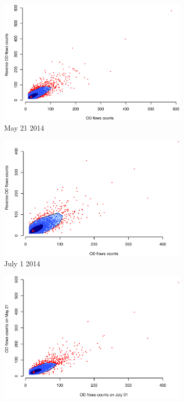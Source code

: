 \documentclass[a4paper,UKenglish]{lipics-v2018}
\begin{document}
\begin{figure}
	\centering
	\begin{subfigure}[b]{0.49\textwidth}
		\includegraphics[width=\textwidth]{images/OD_0521.eps}
		\caption{May 21 2014}
		\label{fig:OD_0521}
	\end{subfigure}
	\hfill %
	\begin{subfigure}[b]{0.49\textwidth}
		\includegraphics[width=\textwidth]{images/OD_0701.eps}
		\caption{July 1 2014}
		\label{fig:OD_0721}
	\end{subfigure}
    \hfill
	\begin{subfigure}[b]{0.49\textwidth}
	\includegraphics[width=\textwidth]{images/OD_0701_0521.eps}

\end{subfigure}
\end{figure}
\end{document}
